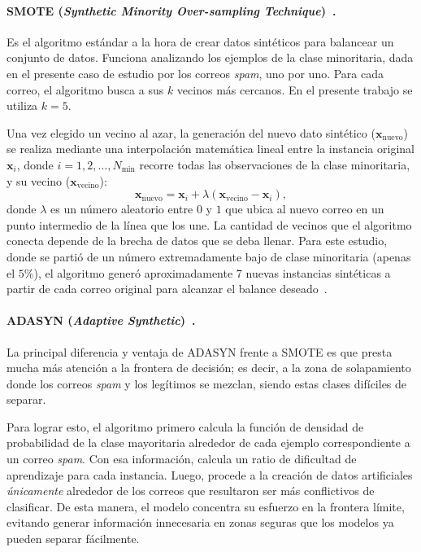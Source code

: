 \documentclass[a4paper,11pt ,openany]{book}
\begin{document}
\paragraph{SMOTE (\textit{Synthetic Minority Over-sampling Technique})~\cite{chawla2002smote}.}{
Es el algoritmo estándar a la hora de crear datos sintéticos para balancear un conjunto de datos. Funciona analizando los ejemplos de la clase minoritaria, dada en el presente caso de estudio por los correos \textit{spam}, uno por uno. Para cada correo, el algoritmo busca a sus $k$ vecinos más cercanos. En el presente trabajo se utiliza $k=5$. 

Una vez elegido un vecino al azar, la generación del nuevo dato sintético ($\boldsymbol{x}_{\text{nuevo}}$) se realiza mediante una interpolación matemática lineal entre la instancia original $\boldsymbol{x}_i$, donde $i = 1,2, \dots, N_{\text{min}}$ recorre todas las observaciones de la clase minoritaria, y su vecino ($\boldsymbol{x}_{\text{vecino}}$):
\begin{equation}
\boldsymbol{x}_{\text{nuevo}} = \boldsymbol{x}_i + \lambda  (\boldsymbol{x}_{\text{vecino}} - \boldsymbol{x}_i),
\end{equation}
donde $\lambda$ es un número aleatorio entre $0$ y $1$ que ubica al nuevo correo en un punto intermedio de la línea que los une. La cantidad de vecinos que el algoritmo conecta depende de la brecha de datos que se deba llenar. Para este estudio, donde se partió de un número extremadamente bajo de clase minoritaria (apenas el $5\%$), el algoritmo generó aproximadamente 7 nuevas instancias
 sintéticas a partir de cada correo original para alcanzar el balance deseado~\cite{chawla2002smote}.}

\paragraph{ADASYN (\textit{Adaptive Synthetic})~\cite{he2008adasyn}.}{
La principal diferencia y ventaja de ADASYN frente a SMOTE es que presta mucha más atención a la frontera de decisión; es decir, a la zona de solapamiento donde los correos \textit{spam} y los legítimos se mezclan, siendo estas clases difíciles de separar. 

Para lograr esto, el algoritmo primero calcula la función de densidad de probabilidad de la clase mayoritaria alrededor de cada ejemplo correspondiente a un correo \textit{spam}. Con esa información, calcula un ratio de dificultad de aprendizaje para cada instancia. Luego, procede a la creación de datos artificiales \textit{únicamente} alrededor de los correos que resultaron ser más conflictivos de clasificar. De esta manera, el modelo concentra su esfuerzo en la frontera límite, evitando generar información innecesaria en zonas seguras que los modelos ya pueden separar fácilmente.}
\end{document}
